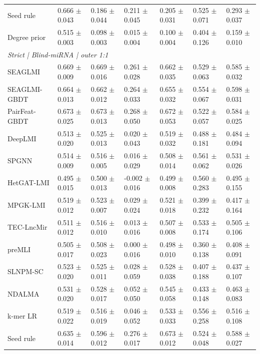 \begin{landscape}
{\begin{longtable}{lllllll}
Seed rule & 0.666 $\pm$ 0.043 & 0.186 $\pm$ 0.044 & 0.211 $\pm$ 0.045 & 0.205 $\pm$ 0.031 & 0.525 $\pm$ 0.071 & 0.293 $\pm$ 0.037 \\
Degree prior & 0.515 $\pm$ 0.003 & 0.098 $\pm$ 0.003 & 0.015 $\pm$ 0.004 & 0.100 $\pm$ 0.004 & 0.404 $\pm$ 0.126 & 0.159 $\pm$ 0.010 \\
\multicolumn{7}{l}{\textit{Strict | Blind-miRNA | outer 1:1}}\\
SEAGLMI & 0.669 $\pm$ 0.009 & 0.669 $\pm$ 0.016 & 0.261 $\pm$ 0.028 & 0.662 $\pm$ 0.035 & 0.529 $\pm$ 0.063 & 0.585 $\pm$ 0.032 \\
SEAGLMI-GBDT & 0.664 $\pm$ 0.013 & 0.662 $\pm$ 0.012 & 0.264 $\pm$ 0.033 & 0.655 $\pm$ 0.032 & 0.554 $\pm$ 0.067 & 0.598 $\pm$ 0.031 \\
PairFeat-GBDT & 0.673 $\pm$ 0.025 & 0.673 $\pm$ 0.013 & 0.268 $\pm$ 0.050 & 0.672 $\pm$ 0.053 & 0.522 $\pm$ 0.057 & 0.584 $\pm$ 0.025 \\
DeepLMI & 0.513 $\pm$ 0.020 & 0.525 $\pm$ 0.013 & 0.020 $\pm$ 0.043 & 0.519 $\pm$ 0.032 & 0.488 $\pm$ 0.181 & 0.484 $\pm$ 0.094 \\
SPGNN & 0.514 $\pm$ 0.009 & 0.516 $\pm$ 0.005 & 0.016 $\pm$ 0.029 & 0.508 $\pm$ 0.014 & 0.561 $\pm$ 0.062 & 0.531 $\pm$ 0.026 \\
HetGAT-LMI & 0.495 $\pm$ 0.015 & 0.500 $\pm$ 0.013 & -0.002 $\pm$ 0.016 & 0.499 $\pm$ 0.008 & 0.560 $\pm$ 0.283 & 0.495 $\pm$ 0.155 \\
MPGK-LMI & 0.519 $\pm$ 0.012 & 0.523 $\pm$ 0.007 & 0.029 $\pm$ 0.024 & 0.521 $\pm$ 0.018 & 0.399 $\pm$ 0.232 & 0.417 $\pm$ 0.164 \\
TEC-LncMir & 0.511 $\pm$ 0.012 & 0.516 $\pm$ 0.010 & 0.013 $\pm$ 0.016 & 0.507 $\pm$ 0.008 & 0.533 $\pm$ 0.174 & 0.505 $\pm$ 0.106 \\
preMLI & 0.505 $\pm$ 0.017 & 0.508 $\pm$ 0.023 & 0.000 $\pm$ 0.016 & 0.498 $\pm$ 0.010 & 0.360 $\pm$ 0.138 & 0.408 $\pm$ 0.091 \\
SLNPM-SC & 0.523 $\pm$ 0.020 & 0.525 $\pm$ 0.011 & 0.028 $\pm$ 0.059 & 0.528 $\pm$ 0.038 & 0.407 $\pm$ 0.188 & 0.437 $\pm$ 0.107 \\
NDALMA & 0.531 $\pm$ 0.020 & 0.528 $\pm$ 0.017 & 0.052 $\pm$ 0.050 & 0.545 $\pm$ 0.058 & 0.433 $\pm$ 0.148 & 0.463 $\pm$ 0.083 \\
k-mer LR & 0.519 $\pm$ 0.022 & 0.516 $\pm$ 0.019 & 0.046 $\pm$ 0.052 & 0.533 $\pm$ 0.033 & 0.556 $\pm$ 0.258 & 0.516 $\pm$ 0.108 \\
Seed rule & 0.635 $\pm$ 0.014 & 0.596 $\pm$ 0.012 & 0.276 $\pm$ 0.017 & 0.673 $\pm$ 0.012 & 0.524 $\pm$ 0.048 & 0.588 $\pm$ 0.027 \\

\end{longtable}}
\end{landscape}
